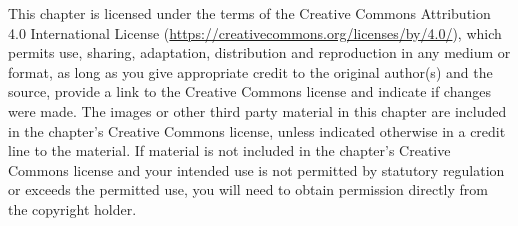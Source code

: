 \documentclass[runningheads,openbib]{llncs}
\begin{document}
\newpage



\vspace{20ex}

 This chapter is licensed under the terms of the Creative Commons
Attribution 4.0 International License (\url{https://creativecommons.org/licenses/by/4.0/}),
which permits use, sharing, adaptation, distribution and reproduction in any medium or
format, as long as you give appropriate credit to the original author(s) and the source,
provide a link to the Creative Commons license and indicate if changes were made.
The images or other third party material in this chapter are included in the chapter's
Creative Commons license, unless indicated otherwise in a credit line to the material. If
material is not included in the chapter's Creative Commons license and your intended
use is not permitted by statutory regulation or exceeds the permitted use, you will need
to obtain permission directly from the copyright holder.
\end{document}
